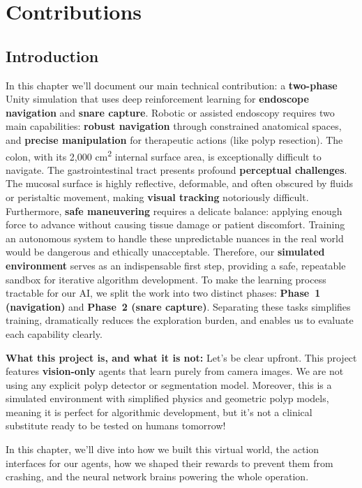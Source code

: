 \chapter{Contributions}
\label{chap:contributions}

\section{Introduction}
In this chapter we'll document our main technical contribution: a \textbf{two-phase} Unity simulation that uses deep reinforcement learning for \textbf{endoscope navigation} and \textbf{snare capture}.
Robotic or assisted endoscopy requires two main capabilities: \textbf{robust navigation} through constrained anatomical spaces, and \textbf{precise manipulation} for therapeutic actions (like polyp resection). The colon, with its 2,000 cm\textsuperscript{2} internal surface area, is exceptionally difficult to navigate. The gastrointestinal tract presents profound \textbf{perceptual challenges}. The mucosal surface is highly reflective, deformable, and often obscured by fluids or peristaltic movement, making \textbf{visual tracking} notoriously difficult. Furthermore, \textbf{safe maneuvering} requires a delicate balance: applying enough force to advance without causing tissue damage or patient discomfort. Training an autonomous system to handle these unpredictable nuances in the real world would be dangerous and ethically unacceptable. Therefore, our \textbf{simulated environment} serves as an indispensable first step, providing a safe, repeatable sandbox for iterative algorithm development. To make the learning process tractable for our AI, we split the work into two distinct phases: \textbf{Phase~1 (navigation)} and \textbf{Phase~2 (snare capture)}. Separating these tasks simplifies training, dramatically reduces the exploration burden, and enables us to evaluate each capability clearly.

\textbf{What this project is, and what it is not:}
Let's be clear upfront. This project features \textbf{vision-only} agents that learn purely from camera images. We are not using any explicit polyp detector or segmentation model. Moreover, this is a simulated environment with simplified physics and geometric polyp models, meaning it is perfect for algorithmic development, but it's not a clinical substitute ready to be tested on humans tomorrow!

In this chapter, we'll dive into how we built this virtual world, the action interfaces for our agents, how we shaped their rewards to prevent them from crashing, and the neural network brains powering the whole operation.





